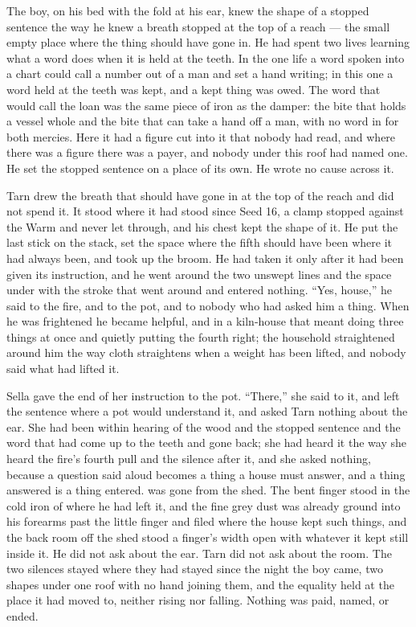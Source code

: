The boy, on his bed with the fold at his ear, knew the shape of a stopped sentence the way he knew a breath stopped at the top of a reach --- the small empty place where the thing should have gone in. He had spent two lives learning what a word does when it is held at the teeth. In the one life a word spoken into a chart could call a number out of a man and set a hand writing; in this one a word held at the teeth was kept, and a kept thing was owed. The word that would call the loan was the same piece of iron as the damper: the bite that holds a vessel whole and the bite that can take a hand off a man, with no word in  for both mercies. Here it had a figure cut into it that nobody had read, and where there was a figure there was a payer, and nobody under this roof had named one. He set the stopped sentence on a place of its own. He wrote no cause across it.

Tarn drew the breath that should have gone in at the top of the reach and did not spend it. It stood where it had stood since Seed 16, a clamp stopped against the Warm and never let through, and his chest kept the shape of it. He put the last stick on the stack, set the space where the fifth should have been where it had always been, and took up the broom. He had taken it only after it had been given its instruction, and he went around the two unswept lines and the space under  with the stroke that went around and entered nothing. “Yes, house,” he said to the fire, and to the pot, and to nobody who had asked him a thing. When he was frightened he became helpful, and in a kiln-house that meant doing three things at once and quietly putting the fourth right; the household straightened around him the way cloth straightens when a weight has been lifted, and nobody said what had lifted it.

\scenebreak

Sella gave the end of her instruction to the pot. “There,” she said to it, and left the sentence where a pot would understand it, and asked Tarn nothing about the ear. She had been within hearing of the wood and the stopped sentence and the word that had come up to the teeth and gone back; she had heard it the way she heard the fire's fourth pull and the silence after it, and she asked nothing, because a question said aloud becomes a thing a house must answer, and a thing answered is a thing entered.  was gone from the shed. The bent finger stood in the cold iron of  where he had left it, and the fine grey dust was already ground into his forearms past the little finger and filed where the house kept such things, and the back room off the shed stood a finger's width open with whatever it kept still inside it. He did not ask about the ear. Tarn did not ask about the room. The two silences stayed where they had stayed since the night the boy came, two shapes under one roof with no hand joining them, and the equality held at the place it had moved to, neither rising nor falling. Nothing was paid, named, or ended.

